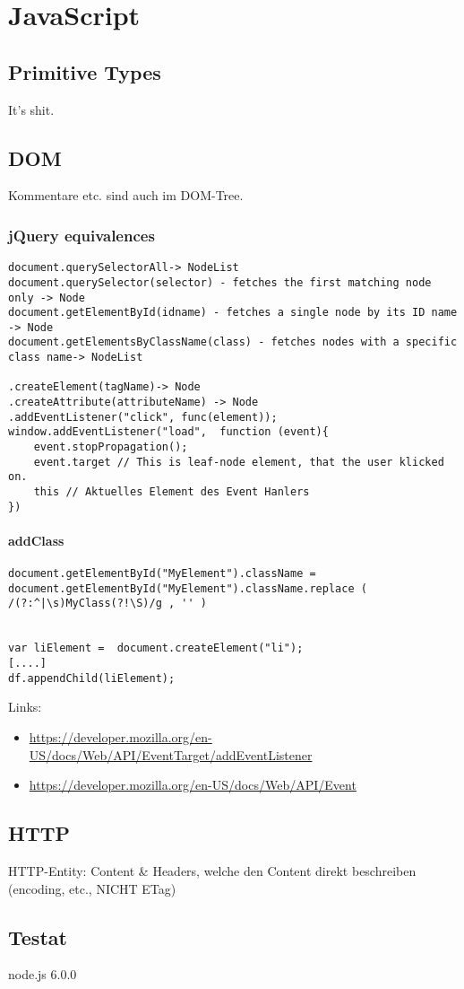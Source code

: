 \section{JavaScript}

\subsection{Primitive Types}
It's shit.


\subsection{DOM}

Kommentare etc. sind auch im DOM-Tree.


\subsubsection{jQuery equivalences}

\begin{verbatim}
document.querySelectorAll-> NodeList
document.querySelector(selector) - fetches the first matching node only -> Node
document.getElementById(idname) - fetches a single node by its ID name -> Node
document.getElementsByClassName(class) - fetches nodes with a specific class name-> NodeList

.createElement(tagName)-> Node
.createAttribute(attributeName) -> Node
.addEventListener("click", func(element));
window.addEventListener("load",  function (event){
	event.stopPropagation();
	event.target // This is leaf-node element, that the user klicked on.
	this // Aktuelles Element des Event Hanlers
})

\end{verbatim}

\paragraph{addClass}

\begin{verbatim}
document.getElementById("MyElement").className = document.getElementById("MyElement").className.replace ( /(?:^|\s)MyClass(?!\S)/g , '' )


var liElement =  document.createElement("li");
[....]
df.appendChild(liElement);
\end{verbatim}

Links:
\begin{itemize}
	\item \url{https://developer.mozilla.org/en-US/docs/Web/API/EventTarget/addEventListener}
	\item \url{https://developer.mozilla.org/en-US/docs/Web/API/Event}
\end{itemize}


\subsection{HTTP}

HTTP-Entity: Content \& Headers, welche den Content direkt beschreiben (encoding, etc., NICHT ETag)

\subsection{Testat}

node.js 6.0.0



